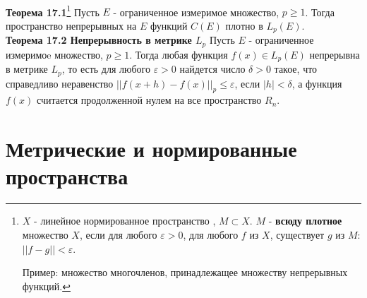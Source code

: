 \documentclass{article}
\begin{document}
	\\
	\textbf{Теорема 17.1}\footnote{$X$ - линейное нормированное пространство , $M\subset X$. $M$ - \textbf{всюду плотное} множество $X$, если для любого $\varepsilon>0$, для любого $f$ из $X$, существует $g$ из $M$: $||f-g||<\varepsilon$.
	
	Пример: множество многочленов, принадлежащее множеству непрерывных функций.} Пусть $E$ - ограниченное измеримое множество, $p\ge 1$. Тогда пространство непрерывных на $E$ функций $C(E)$ плотно в ${L}_{p}(E)$.\\
	\textbf{Теорема 17.2 Непрерывность в метрике ${L}_{p}$} Пусть $E$ - ограниченное измеримоe множество, $p\ge 1$. Тогда любая функция $f(x)\in {L}_{p}(E)$ непрерывна в метрике ${L}_{p}$, то есть для
	любого $\varepsilon>0$ найдется число $\delta>0$ такое, что справедливо неравенство ${||f(x+h)-f(x)||}_{p}\le \varepsilon$, если $|h|<\delta$, а функция $f(x)$ считается продолженной нулем на все
	пространство ${R}_{n}$.\\
\section{Метрические и нормированные пространства}
\end{document}
